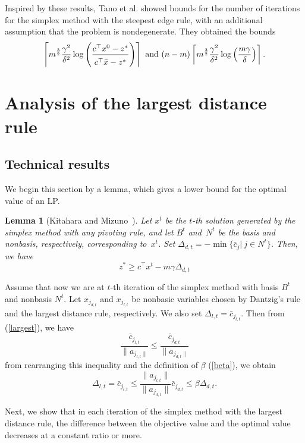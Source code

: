 \documentclass[12pt]{article}
\newtheorem{lemma}{Lemma}[section]
\newcommand{\getheight}{\rule{0em}{2.5ex}}
\begin{document}
Inspired by these results, Tano et al. \cite{tano2019} showed bounds for the number of iterations for the simplex method with the steepest edge rule, with an additional assumption that the problem is nondegenerate.
They obtained the bounds
\[
\left\lceil m^{\frac{3}{2}} \frac{\gamma^2}{\delta^2} \log\left( \frac{\getheight c^{\top}x^0-z^*}{\getheight c^{\top}\bar{x}-z^*} \right) \right\rceil~\mathrm{and}~
(n-m) \left\lceil m^{\frac{3}{2}} \frac{\gamma^2}{\delta^2} \log\left(\frac{m\gamma}{\delta}\right) \right\rceil.\]  
%
\section{Analysis of the largest distance rule}
\subsection{Technical results}
We begin this section by a lemma, which  gives a lower bound for the optimal value of an LP.
%
\begin{lemma}[Kitahara and Mizuno~\cite{km2013}] \label{lem:Lower-Bound-Of-Optimal-Value}
Let $x^t$ be the $t$-th solution generated by the simplex method with any pivoting rule, and let $B^t$ and~$N^t$ be the basis and nonbasis, respectively, corresponding to~$x^t$.
Set $\Delta_{d,t} = -\min\{\bar{c}_j|~j\in N^t\}$.
Then, we have
\begin{equation} \label{eq:Lower-Bound-Of-Optimal-Value}
  z^* \ge c^{\top} x^t - m \gamma \Delta_{d,t}
\end{equation}
\end{lemma}

Assume that now we are at $t$-th iteration of the simplex method with basis $B^t$ and nonbasis $N^t$. 
Let $x_{j_{d,t}}$ and $x_{j_{l,t}}$ be nonbasic variables chosen by Dantzig's rule and the largest distance rule, respectively. 
We also set $\Delta_{l,t}=\bar{c}_{j_{l,t}}$.
Then from (\ref{largest}), we have
\[
\frac{\bar{c}_{j_{l,t}}}{\|a_{j_{l,t}\|}}\le \frac{\bar{c}_{j_{d,t}}}{\|a_{j_{d,t}\|}}
\]
from rearranging this inequality and the definition of $\beta$ (\ref{beta}), we obtain
\begin{equation}
\Delta_{l,t}=\bar{c}_{j_{l,t}}\le \frac{\|a_{j_{l,t}}\|}{\|a_{j_{d,t}}\|}\bar{c}_{j_{d,t}}\le \beta \Delta_{d,t}.
\label{estimate}
\end{equation} 

Next, we show that in each iteration of the simplex method with the largest distance rule, the difference between the objective value and the optimal value decreases at a constant ratio or more.
\end{document}

